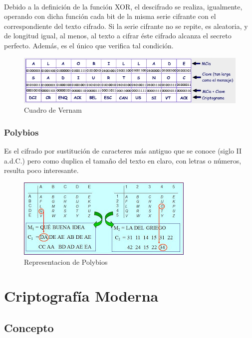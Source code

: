 \documentclass[11pt, conference]{IEEEtran}
\begin{document}
\

 Debido a la definición de la función XOR, el descifrado se realiza, igualmente, operando con dicha función cada bit de la misma serie cifrante con el correspondiente del texto cifrado. Si la serie cifrante no se repite, es aleatoria, y de longitud igual, al menos, al texto a cifrar éste cifrado alcanza el secreto perfecto. Además, es el único que verifica tal condición.
 
 
 \begin{figure}[h]
 	\begin{center}
 		\includegraphics[scale=0.38]{vernam2223.jpg}
 		\caption{Cuadro de Vernam} 
 	\end{center}
 \end{figure}
\subsubsection{Polybios}

Es el cifrado por sustitución de caracteres más antiguo que se conoce (siglo II a.d.C.) pero como duplica el tamaño del texto en claro, con letras o números, resulta poco interesante.
	
	\begin{figure}[h]
		\begin{center}
			\includegraphics[scale=0.7]{4.jpg}
			\caption{Representacion de Polybios} 
		\end{center}
	\end{figure}	
\pagebreak	
	
\section{Criptografía Moderna}

\subsection{Concepto}
\end{document}

